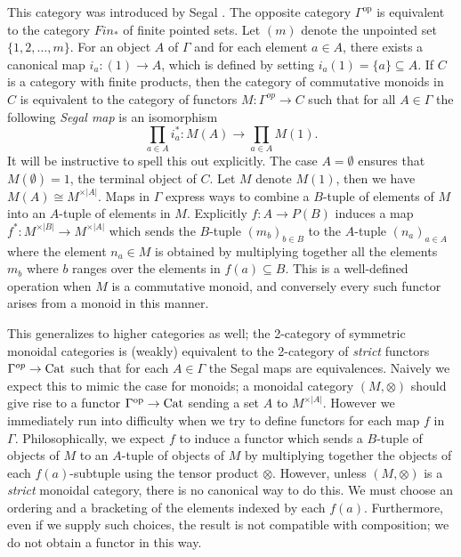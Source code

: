 \documentclass{amsart}
\begin{document}
\nid This category was introduced by Segal \cite{MR0353298}.  The opposite category $\Gamma^\textrm{op}$ is equivalent to the category $Fin_*$ of finite pointed sets. Let $(m)$ denote the unpointed set $\{ 1, 2, \dots, m\}$. For an object $A$ of $\Gamma$ and for each element $a \in A$, there exists a canonical map $i_a: (1) \to A$, which is defined by setting $i_a(1) = \{a\} \subseteq A$. If $C$ is a category with finite products, then the category of commutative monoids in $C$ is equivalent to the category of functors $M:\Gamma^{op} \to C$ such that for all $A\in \Gamma$ the following {\em Segal map} is an isomorphism
\begin{equation*}
	\prod_{a \in A} i_a^*: M(A) \to \prod_{a \in A} M(1).
\end{equation*}
It will be instructive to spell this out explicitly. The case $A=\emptyset$ ensures that $M(\emptyset) = 1$, the terminal object of $C$.  Let $M$ denote $M(1)$, then we have $M(A) \cong M^{\times |A|}$. Maps in $\Gamma$ express ways to combine a $B$-tuple of elements of $M$ into an $A$-tuple of elements in $M$. Explicitly $f: A \to P(B)$
induces a map $f^*: M^{\times |B|} \to M^{\times |A|}$ which sends the $B$-tuple $(m_b)_{b \in B}$ to the $A$-tuple $(n_a)_{a \in A}$ where the element $n_a \in M$ is obtained by multiplying together all the elements $m_b$ where $b$ ranges over the elements in $f(a) \subseteq B$. This is a well-defined operation when $M$ is a commutative monoid, and conversely every such functor arises from a monoid in this manner. 

This generalizes to higher categories as well; the 2-category of symmetric monoidal categories is (weakly) equivalent to the 2-category of {\em strict} functors $\Gamma^{op} \to \mathrm{Cat}$ such that for each $A \in \Gamma$ the Segal maps are equivalences.  Naively we expect this to mimic the case for monoids; a monoidal category $(M, \otimes)$ should give rise to a functor $\Gamma^\text{op} \to \mathrm{Cat}$ sending a set $A$ to $M^{\times |A|}$. However we immediately run into difficulty when we try to define functors for each map $f$ in $\Gamma$. Philosophically, we expect $f$ to induce a functor which sends a $B$-tuple of objects of $M$ to an $A$-tuple of objects of $M$ by multiplying together the objects of each $f(a)$-subtuple using the tensor product $\otimes$. However, unless $(M, \otimes)$ is a {\em strict} monoidal category, there is no canonical way to do this. We must choose an ordering and a bracketing of the elements indexed by each $f(a)$. Furthermore, even if we supply such choices, the result is not compatible with composition; we do not obtain a functor in this way. 
\end{document}
